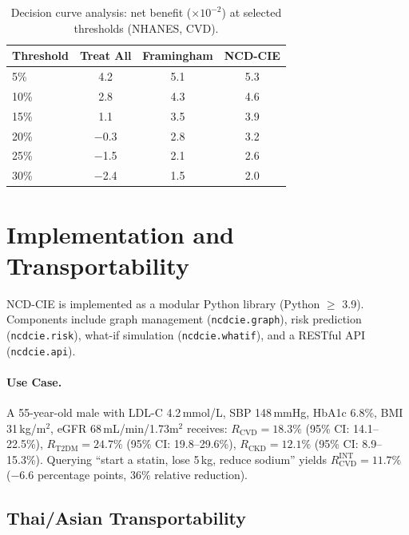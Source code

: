 \documentclass[runningheads]{llncs}
\begin{document}
\renewcommand{\arraystretch}{1.2}
\begin{table}[t]
\centering
\caption{Decision curve analysis: net benefit ($\times 10^{-2}$) at
selected thresholds (NHANES, CVD).}
\label{tab:dca}
\small
\begin{tabular}{@{}lccc@{}}
\toprule
\textbf{Threshold} & \textbf{Treat All} & \textbf{Framingham} &
\textbf{NCD-CIE} \\
\midrule
5\%  & 4.2 & 5.1 & 5.3 \\
10\% & 2.8 & 4.3 & 4.6 \\
15\% & 1.1 & 3.5 & 3.9 \\
20\% & $-$0.3 & 2.8 & 3.2 \\
25\% & $-$1.5 & 2.1 & 2.6 \\
30\% & $-$2.4 & 1.5 & 2.0 \\
\bottomrule
\end{tabular}
\end{table}
\renewcommand{\arraystretch}{1.0}

\section{Implementation and Transportability}\label{sec:impl}

NCD-CIE is implemented as a modular Python library (Python $\geq$
3.9).
Components include graph management (\texttt{ncdcie.graph}),
risk prediction (\texttt{ncdcie.risk}), what-if simulation
(\texttt{ncdcie.whatif}), and a RESTful API (\texttt{ncdcie.api}).

\paragraph{Use Case.}
A 55-year-old male with LDL-C 4.2\,mmol/L, SBP 148\,mmHg, HbA1c
6.8\%, BMI 31\,kg/m$^2$, eGFR 68\,mL/min/1.73m$^2$ receives:
$R_{\text{CVD}} = 18.3\%$ (95\% CI: 14.1--22.5\%),
$R_{\text{T2DM}} = 24.7\%$ (95\% CI: 19.8--29.6\%),
$R_{\text{CKD}} = 12.1\%$ (95\% CI: 8.9--15.3\%).
Querying ``start a statin, lose 5\,kg, reduce sodium'' yields
$R_{\text{CVD}}^{\text{INT}} = 11.7\%$ ($-$6.6 percentage points,
36\% relative reduction).

\subsection{Thai/Asian Transportability}\label{sec:thai}
\end{document}
